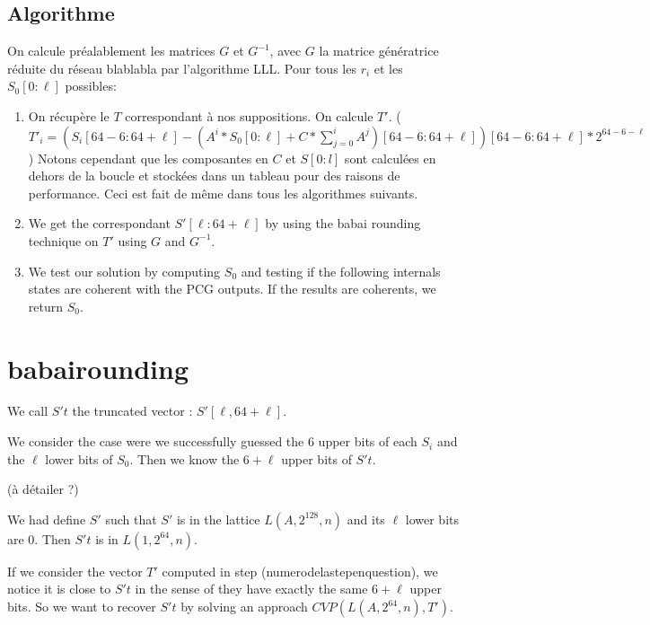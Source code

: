 \documentclass[preprint]{iacrtrans}
\begin{document}
\subsection{Algorithme}
On calcule préalablement les matrices $G$ et $G^{-1}$, avec $G$ la matrice génératrice réduite du réseau blablabla par l'algorithme LLL.
Pour tous les $r_i$ et les $S_0[0 : \ell]$ possibles:\\
\begin{enumerate}
\item On récupère le $T$ correspondant à nos suppositions. On calcule $T'$. ($T'_i = (S_i[64 - 6 : 64 + \ell] - (A^i*S_0[0 : \ell] + C * \sum_{j = 0}^i A^j)[64 - 6 : 64 + \ell])[64 - 6 : 64 + \ell] * 2^{64 - 6 - \ell}$)
Notons cependant que les composantes en $C$ et $S[0:l]$ sont calculées en dehors de la boucle et stockées dans un tableau pour des raisons de performance. Ceci est fait de même dans tous les algorithmes suivants.

\item We get the correspondant $S'[\ell : 64 + \ell]$ by using the babai rounding technique on $T'$ using $G$ and $G^{-1}$.

\item We test our solution by computing $S_0$ and testing if the following internals states are coherent with the PCG outputs. If the results are coherents, we return $S_0$.

\end{enumerate}


\section{babairounding}

We call \(S't\) the truncated vector : \(S'[\ell,64+\ell]\).

We consider the case were we successfully guessed the 6 upper bits of each \(S_i\) and the \(\ell\) lower bits of \(S_0\). Then we know the \(6+\ell\) upper bits of \(S't\).

(à détailer ?)	

We had define \(S'\) such that \(S'\) is in the lattice \(L(A,2^{128},n)\) and its \(\ell \) lower bits are 0. Then \(S't\) is in \(L(1,2^{64},n)\).

If we consider the vector \(T'\) computed in step (numerodelastepenquestion), we notice it is close to \(S't\) in the sense of they have exactly the same \(6+\ell\) upper bits. So we want to recover \(S't\) by solving an approach \(CVP(L(A,2^{64},n),T')\).
\end{document}
